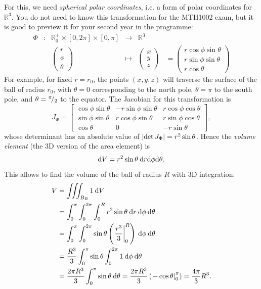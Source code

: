 \begin{example}
For this, we need \emph{spherical polar coordinates}, i.e. a form of polar coordinates for $\mathbb{R}^3$. You do not need to know this transformation for the MTH1002 exam, but it is good to preview it for your second year in the programme:
\begin{equation*}
\begin{array}{cccccc}
\Phi & : & \mathbb{R}^+_0\times[0,2\pi]\times[0,\pi] & \rightarrow & \mathbb{R}^3 & \\
&   & \begin{pmatrix} r \\ \phi \\ \theta \end{pmatrix} 
& \mapsto & \begin{pmatrix} x \\ y \\ z \end{pmatrix}  
& = \begin{pmatrix} r\cos\phi\sin\theta \\ r\sin\phi\sin\theta \\ r\cos\theta \end{pmatrix} 
\end{array}
\end{equation*}
For example, for fixed $r=r_0$, the points $(x,y,z)$ will traverse the surface of the ball of radius $r_0$, with $\theta = 0$ corresponding to the north pole, $\theta = \pi$ to the south pole, and $\theta = {}^{\pi}\!/_{2}$ to the equator.
The Jacobian for this transformation is
\[ J_\Phi = \begin{bmatrix}
\cos\phi\sin\theta & -r\sin\phi\sin\theta & r\cos\phi\cos\theta \\
\sin\phi\sin\theta &  r\cos\phi\sin\theta & r\sin\phi\cos\theta \\
\cos\theta & 0 & -r\sin\theta  
\end{bmatrix}, \]
whose determinant has an absolute value of $\left| \det J_\Phi \right| = r^2\sin\theta$. Hence the \emph{volume element} (the 3D version of the area element) is
\[ \mathrm{d} V = r^2\sin\theta \: \mathrm{d} r \mathrm{d}\phi\mathrm{d}\theta. \]
This allows to find the volume of the ball of radius $R$ with 3D integration:
\begin{equation*}
\begin{split}
V & = \iiint_{B_R} 1 \: \mathrm{d} V \\
& = \int_{0}^{\pi} \int_{0}^{2\pi} \int_{0}^{R} r^2\sin\theta \: \mathrm{d} r \: \mathrm{d} \phi \: \mathrm{d} \theta \\
& = \int_{0}^{\pi} \int_{0}^{2\pi} \sin\theta\left(\left.\frac{r^3}{3}\right|_0^R\right) \: \mathrm{d} \phi \: \mathrm{d} \theta \\
& = \frac{R^3}{3}\int_{0}^{\pi} \sin\theta\int_{0}^{2\pi} 1 \: \mathrm{d} \phi \: \mathrm{d} \theta \\
& = \frac{2\pi R^3}{3}\int_{0}^{\pi} \sin\theta \: \mathrm{d} \theta
= \frac{2\pi R^3}{3}\left( \left. -\cos\theta\right|_0^\pi \right) = \frac{4\pi}{3}R^3.
\end{split}
\end{equation*}
\end{example}

